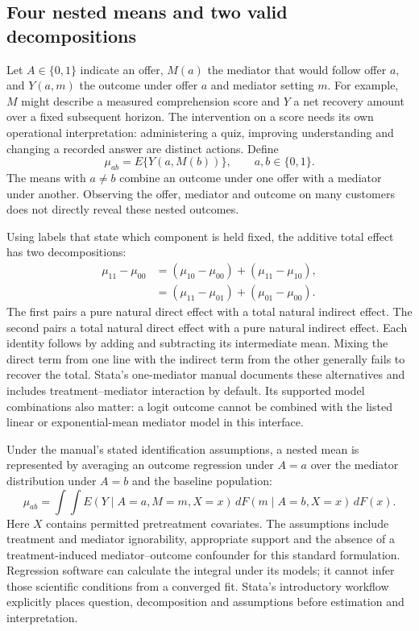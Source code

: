 \subsection{Four nested means and two valid decompositions}
\label{exec20:med-targets}
Let $A\in\{0,1\}$ indicate an offer, $M(a)$ the mediator that would follow offer $a$, and $Y(a,m)$ the outcome under offer $a$ and mediator setting $m$. For example, $M$ might describe a measured comprehension score and $Y$ a net recovery amount over a fixed subsequent horizon. The intervention on a score needs its own operational interpretation: administering a quiz, improving understanding and changing a recorded answer are distinct actions. Define
\begin{equation}
 \mu_{ab}=E\{Y(a,M(b))\},\qquad a,b\in\{0,1\}.
 \label{exec20:med-means}
\end{equation}
The means with $a\ne b$ combine an outcome under one offer with a mediator under another. Observing the offer, mediator and outcome on many customers does not directly reveal these nested outcomes.

Using labels that state which component is held fixed, the additive total effect has two decompositions:
\begin{align}
 \mu_{11}-\mu_{00}
  &=(\mu_{10}-\mu_{00})+(\mu_{11}-\mu_{10}),\nonumber\\
  &=(\mu_{11}-\mu_{01})+(\mu_{01}-\mu_{00}).
 \label{exec20:med-decompositions}
\end{align}
The first pairs a pure natural direct effect with a total natural indirect effect. The second pairs a total natural direct effect with a pure natural indirect effect. Each identity follows by adding and subtracting its intermediate mean. Mixing the direct term from one line with the indirect term from the other generally fails to recover the total. Stata's one-mediator manual documents these alternatives and includes treatment--mediator interaction by default. Its supported model combinations also matter: a logit outcome cannot be combined with the listed linear or exponential-mean mediator model in this interface.~\citep{exec20_med_stata_one}

Under the manual's stated identification assumptions, a nested mean is represented by averaging an outcome regression under $A=a$ over the mediator distribution under $A=b$ and the baseline population:
\begin{equation}
 \mu_{ab}=\int\!\!\int
 E(Y\mid A=a,M=m,X=x)\,dF(m\mid A=b,X=x)\,dF(x).
 \label{exec20:med-integral}
\end{equation}
Here $X$ contains permitted pretreatment covariates. The assumptions include treatment and mediator ignorability, appropriate support and the absence of a treatment-induced mediator--outcome confounder for this standard formulation. Regression software can calculate the integral under its models; it cannot infer those scientific conditions from a converged fit. Stata's introductory workflow explicitly places question, decomposition and assumptions before estimation and interpretation.~\citep{exec20_med_stata_one,exec20_med_stata_intro}

